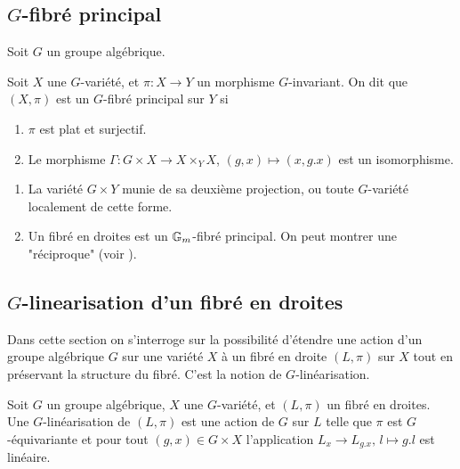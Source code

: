 \subsection{$G$-fibré principal}

\noindent Soit $G$ un groupe algébrique.

\begin{defn}\label{GPrincipalBundleDef}
Soit $X$ une $G$-variété, et $\pi:X\rightarrow Y$ un morphisme $G$-invariant. On dit que $(X,\pi)$ est un $G$-fibré principal sur $Y$ si
\begin{enumerate}
\item $\pi$ est plat et surjectif.
\item Le morphisme $\Gamma:G\times X\rightarrow X\times_Y X$, $(g,x)\mapsto (x,g.x)$ est un isomorphisme.
\end{enumerate}
\end{defn}

\begin{ex}
\begin{enumerate}
\item La variété $G\times Y$ munie de sa deuxième projection, ou toute $G$-variété localement de cette forme.
\item Un fibré en droites est un $\mathbb{G}_m$-fibré principal. On peut montrer une "réciproque" (voir \cite[3.1.3]{LinearizationGBrion}).
\end{enumerate}
\end{ex}

\subsection{$G$-linearisation d'un fibré en droites}

Dans cette section on s'interroge sur la possibilité d'étendre une action d'un groupe algébrique $G$ sur une variété $X$ à un fibré en droite $(L,\pi)$ sur $X$ tout en préservant la structure du fibré. C'est la notion de $G$-linéarisation. 

\begin{defn}[$G$-linéarisation]
Soit $G$ un groupe algébrique, $X$ une $G$-variété, et $(L,\pi)$ un fibré en droites. Une $G$-linéarisation de  $(L,\pi)$ est une action de $G$ sur $L$ telle que $\pi$ est $G$-équivariante et pour tout $(g,x)\in G\times X$ l'application $L_x\rightarrow L_{g.x},\, l\mapsto g.l$ est linéaire.
\end{defn}

